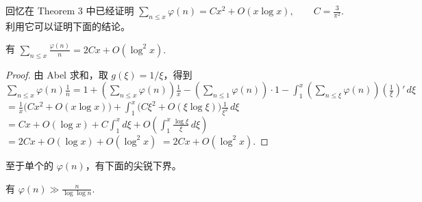 \begin{example}
	回忆在 Theorem 3 中已经证明
	\(\textstyle \sum_{n\leq\allowbreak{} x}\varphi(n)=\allowbreak{}Cx^2+\allowbreak{}O(x\log x),\allowbreak{} \qquad C=\allowbreak{}\frac3{\pi^2}.\)
	利用它可以证明下面的结论。
\end{example}

\begin{theorem}[原文 Theorem 6]
	有
	\(\textstyle \sum_{n\leq\allowbreak{} x}\frac{\varphi(n)}n =\allowbreak{} 2Cx+\allowbreak{}O(\log^2 x).\)
\end{theorem}

\begin{proof}
	由 Abel 求和，取 $g(\xi)=1/\xi$，得到
	\(\textstyle \sum_{n\leq\allowbreak{} x}\varphi(n)\frac1n =\allowbreak{} 1+\allowbreak{} \left(\sum_{n\leq\allowbreak{} x}\varphi(n)\right)\frac1x - \left(\sum_{n\leq\allowbreak{} 1}\varphi(n)\right)\cdot 1 -\int_1^x \left(\sum_{n\leq\allowbreak{} \xi}\varphi(n)\right) \left(\frac1\xi\right)'\,d\xi\) \(\textstyle =\allowbreak{} \frac1x\bigl(Cx^2+\allowbreak{}O(x\log x)\bigr) +\allowbreak{} \int_1^x \bigl(C\xi^2+\allowbreak{}O(\xi\log \xi)\bigr)\frac1{\xi^2}\,d\xi\) \(\textstyle =\allowbreak{} Cx+\allowbreak{}O(\log x) +\allowbreak{} C\int_1^x d\xi +\allowbreak{} O\left(\int_1^x\frac{\log \xi}{\xi}\,d\xi\right)\) \(\textstyle =\allowbreak{} 2Cx+\allowbreak{}O(\log x)+\allowbreak{}O(\log^2 x)\) \(\textstyle =\allowbreak{} 2Cx+\allowbreak{}O(\log^2 x).\)
\end{proof}

至于单个的 $\varphi(n)$，有下面的尖锐下界。

\begin{theorem}[原文 Theorem 7]
	有
	\(\textstyle \varphi(n)\gg\allowbreak{} \frac{n}{\log\log n}.\)
\end{theorem}

